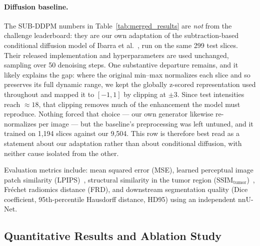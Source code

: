 \documentclass[runningheads,a4paper]{llncs}
\begin{document}
\paragraph{Diffusion baseline.}
The SUB-DDPM numbers in Table~\ref{tab:merged_results} are \emph{not} from the challenge leaderboard: they are our own adaptation of the subtraction-based conditional diffusion model of Ibarra et al.~\cite{ibarra2025diffusion}, run on the same 299 test slices. Their released implementation and hyperparameters are used unchanged, sampling over 50 denoising steps. One substantive departure remains, and it likely explains the gap: where the original min--max normalizes each slice and so preserves its full dynamic range, we kept the globally z-scored representation used throughout and mapped it to $[-1,1]$ by clipping at $\pm 3$. Since test intensities reach $\approx 18$, that clipping removes much of the enhancement the model must reproduce. Nothing forced that choice --- our own generator likewise re-normalizes per image --- but the baseline's preprocessing was left untuned, and it trained on 1,194 slices against our 9,504. This row is therefore best read as a statement about our adaptation rather than about conditional diffusion, with neither cause isolated from the other.

Evaluation metrics include: mean squared error (MSE), learned perceptual image patch similarity (LPIPS)~\cite{zhang2018lpips}, structural similarity in the tumor region ($\text{SSIM}_{\text{tumor}}$)~\cite{wang2004image}, Fr\'{e}chet radiomics distance (FRD), and downstream segmentation quality (Dice coefficient, 95th-percentile Hausdorff distance, HD95) using an independent nnU-Net.

\subsection{Quantitative Results and Ablation Study}
\label{subsec:results}
\end{document}
